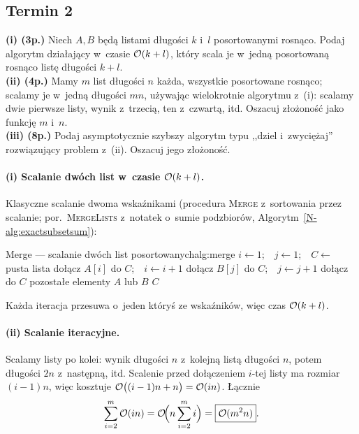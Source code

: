 \subsection{Termin 2}

\begin{zadanie}
	\textbf{(i) (3p.)} Niech $A,B$ będą listami długości $k$ i~$l$ posortowanymi
	rosnąco. Podaj algorytm działający w~czasie $\mathcal{O}(k+l)$, który scala je w~jedną
	posortowaną rosnąco listę długości $k+l$.\\
	\textbf{(ii) (4p.)} Mamy $m$ list długości $n$ każda, wszystkie posortowane
	rosnąco; scalamy je w~jedną długości $mn$, używając wielokrotnie algorytmu
	z~(i): scalamy dwie pierwsze listy, wynik z~trzecią, ten z~czwartą, itd.
	Oszacuj złożoność jako funkcję $m$ i~$n$.\\
	\textbf{(iii) (8p.)} Podaj asymptotycznie szybszy algorytm typu ,,dziel
	i~zwyciężaj'' rozwiązujący problem z~(ii). Oszacuj jego złożoność.
\end{zadanie}

\paragraph{(i) Scalanie dwóch list w~czasie $\mathcal{O}(k+l)$.}
Klasyczne scalanie dwoma wskaźnikami (procedura \textsc{Merge} z~sortowania
przez scalanie; por.\ \textsc{MergeLists} z~notatek o~sumie podzbiorów,
Algorytm~\ref{N-alg:exactsubsetsum}):

\begin{alg}{Merge --- scalanie dwóch list posortowanych}{alg:merge}
	\State $i\gets 1$;\ \ $j\gets 1$;\ \ $C\gets$ pusta lista
	\State dołącz $A[i]$ do $C$;\ \ $i\gets i+1$
	\Else
	\State dołącz $B[j]$ do $C$;\ \ $j\gets j+1$
	\EndIf
	\EndWhile
	\State dołącz do $C$ pozostałe elementy $A$ lub $B$
	\State \Return $C$
	\EndFunction
\end{alg}
Każda iteracja przesuwa o~jeden któryś ze wskaźników, więc czas $\mathcal{O}(k+l)$.

\paragraph{(ii) Scalanie iteracyjne.}
Scalamy listy po kolei: wynik długości $n$ z~kolejną listą długości $n$, potem
długości $2n$ z~następną, itd. Scalenie przed dołączeniem $i$-tej listy ma
rozmiar $(i-1)n$, więc kosztuje $\mathcal{O}\big((i-1)n+n\big)=\mathcal{O}(in)$. Łącznie
\[
	\sum_{i=2}^{m}\mathcal{O}(in)=\mathcal{O}\!\Big(n\sum_{i=2}^{m} i\Big)=\boxed{\mathcal{O}(m^2 n)}.
\]

